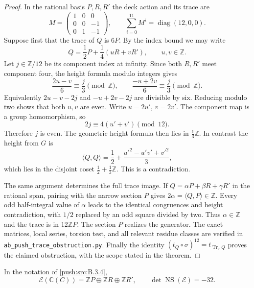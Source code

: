 \begin{proof}
In the rational basis $P,R,R'$ the
deck action and its trace are
\[
 M=\begin{pmatrix}1&0&0\\0&0&-1\\0&1&-1\end{pmatrix},
 \qquad \sum_{i=0}^{11}M^i=
       \operatorname{diag}(12,0,0).
\]
Suppose first that the trace of $Q$ is
$6P$. By the index bound we may write
\[
 Q=\frac12P+\frac14(uR+vR'),\qquad u,v\in\mathbb Z.
\]
Let $j\in\mathbb Z/12$ be its component
index at infinity. Since both $R,R'$
meet component four, the height formula
modulo integers gives
\[
 \frac{2u-v}{6}\equiv\frac j3\pmod{\mathbb Z},
 \qquad
 \frac{-u+2v}{6}\equiv\frac j3\pmod{\mathbb Z}.
\]
Equivalently $2u-v-2j$ and $-u+2v-2j$
are divisible by six. Reducing modulo
two shows that both $u,v$ are even.
Write $u=2u'$, $v=2v'$. The component
map is a group homomorphism, so
\[
 2j\equiv4(u'+v')\pmod{12}.
\]
Therefore $j$ is even. The geometric
height formula then lies in
$\tfrac13\mathbb Z$. In contrast the
height from $G$ is
\[
 \langle Q,Q\rangle
 =\frac12+\frac{u'^2-u'v'+v'^2}{3},
\]
which lies in the disjoint coset
$\tfrac12+\tfrac13\mathbb Z$.
This is a contradiction.

The same argument determines the full
trace image. If $Q=\alpha P+\beta R+\gamma R'$
in the rational span, pairing with the
narrow section $P$ gives
$2\alpha=\langle Q,P\rangle\in\mathbb Z$.
Every odd half-integral value of $\alpha$
leads to the identical congruences and
height contradiction, with $1/2$
replaced by an odd square divided by
two. Thus $\alpha\in\mathbb Z$ and
the trace is in $12\mathbb ZP$.
The section $P$ realizes the generator.
The exact matrices, local series,
torsion test, and all relevant residue
classes are verified in
\texttt{ab\_push\_trace\_obstruction.py}.
Finally the identity
$(t_Q\circ\sigma)^{12}=t_{\operatorname{Tr}_\sigma Q}$
proves the claimed obstruction, with
the scope stated in the theorem.
\end{proof}

\begin{corollary}\label{push:src:B.3.5}\label{push:B35}
In the notation of \ref{push:src:B.3.4},
\[
 \mathscr E(\mathbb C(C))
   =\mathbb ZP\oplus\mathbb ZR\oplus\mathbb ZR',
 \qquad \det\operatorname{NS}(\mathscr E)=-32.
\]
\end{corollary}

